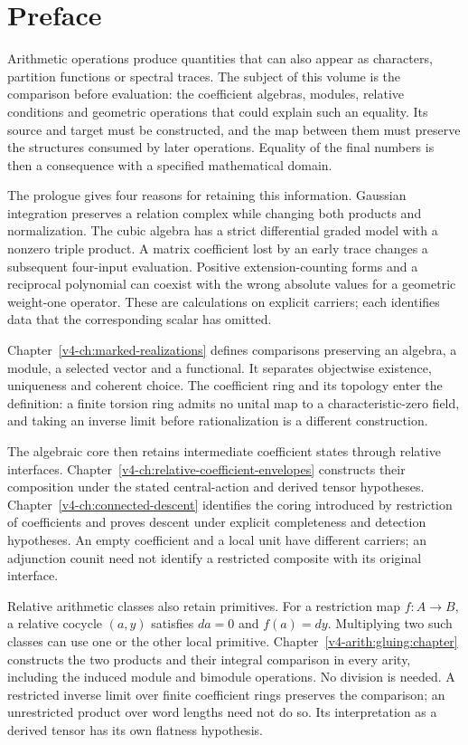 \chapter*{Preface}
\label{v4-ch:preface}

Arithmetic operations produce quantities that can also appear as
characters, partition functions or spectral traces. The subject of this
volume is the comparison before evaluation: the coefficient algebras,
modules, relative conditions and geometric operations that could explain
such an equality. Its source and target must be constructed, and the
map between them must preserve the structures consumed by later
operations. Equality of the final numbers is then a consequence with a
specified mathematical domain.

The prologue gives four reasons for retaining this information.
Gaussian integration preserves a relation complex while changing both
products and normalization. The cubic algebra has a strict differential
graded model with a nonzero triple product. A matrix coefficient lost
by an early trace changes a subsequent four-input evaluation. Positive
extension-counting forms and a reciprocal polynomial can coexist with
the wrong absolute values for a geometric weight-one operator. These
are calculations on explicit carriers; each identifies data that the
corresponding scalar has omitted.

Chapter~\ref{v4-ch:marked-realizations} defines comparisons preserving
an algebra, a module, a selected vector and a functional. It separates
objectwise existence, uniqueness and coherent choice. The coefficient
ring and its topology enter the definition: a finite torsion ring admits
no unital map to a characteristic-zero field, and taking an inverse
limit before rationalization is a different construction.

The algebraic core then retains intermediate coefficient states through
relative interfaces. Chapter~\ref{v4-ch:relative-coefficient-envelopes}
constructs their composition under the stated central-action and derived
tensor hypotheses. Chapter~\ref{v4-ch:connected-descent} identifies the
coring introduced by restriction of coefficients and proves descent
under explicit completeness and detection hypotheses. An empty
coefficient and a local unit have different carriers; an adjunction
counit need not identify a restricted composite with its original
interface.

Relative arithmetic classes also retain primitives. For a restriction
map \(f:A\to B\), a relative cocycle \((a,y)\) satisfies
\(da=0\) and \(f(a)=dy\). Multiplying two such classes can use
one or the other local primitive. Chapter~\ref{v4-arith:gluing:chapter}
constructs the two products and their integral comparison in every
arity, including the induced module and bimodule operations. No
division is needed. A restricted inverse limit over finite coefficient
rings preserves the comparison; an unrestricted product over word
lengths need not do so. Its interpretation as a derived tensor has its
own flatness hypothesis.

